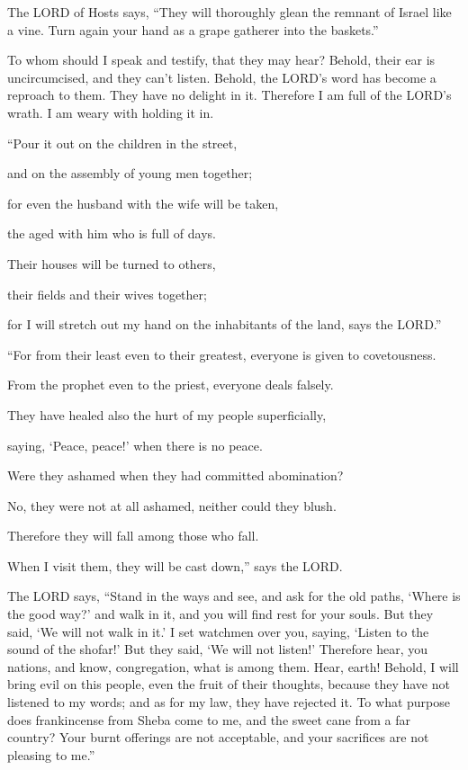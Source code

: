 \myverse{}The LORD of Hosts says, “They will thoroughly glean the remnant
of Israel like a vine. Turn again your hand as a grape gatherer into the baskets.”


\myverse{}To whom should I speak and testify, that they may hear? Behold, their ear is uncircumcised, and they can’t listen. Behold, the LORD’s word has become a reproach to them. They have no delight in it. \myverse{}Therefore I am full of the LORD’s wrath. I am weary with holding it in.

“Pour it out on the children in the street,

and on the assembly of young men together;

for even the husband with the wife will be taken,

the aged with him who is full of days.


\myverse{}Their houses will be turned to others,

their fields and their wives together;

for I will stretch out my hand on the inhabitants of the land, says the LORD.”


\myverse{}“For from their least even to their greatest, everyone is given
to covetousness.

From the prophet even to the priest, everyone deals falsely.


\myverse{}They have healed also the hurt of my people superficially,

saying, ‘Peace, peace!’ when there is no peace.


\myverse{}Were they ashamed when they had committed abomination?

No, they were not at all ashamed, neither could they blush.

Therefore they will fall among those who fall.

When I visit them, they will be cast down,” says the LORD.


\myverse{}The LORD says, “Stand in the ways and see, and ask for the old paths, ‘Where is the good way?’ and walk in it, and you will find rest for your souls. But they said, ‘We will not walk in it.’ \myverse{}I set watchmen over you, saying, ‘Listen to the sound of the shofar!’ But they said, ‘We will not listen!’ \myverse{}Therefore hear, you nations, and know, congregation, what is among them. \myverse{}Hear, earth! Behold, I will bring evil on this people, even the fruit of their thoughts, because they have not listened to my words; and as for my law, they have rejected it. \myverse{}To what purpose does frankincense from Sheba come to me, and the sweet cane from a far country? Your burnt offerings are not acceptable, and your sacrifices are not pleasing to me.”


